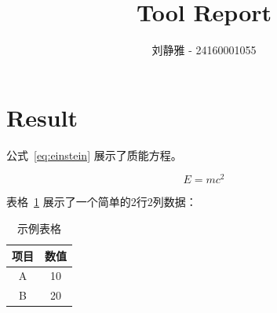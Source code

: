 \documentclass{article}
\begin{document}
\title{Tool Report}
\author{刘静雅 - 24160001055}
\maketitle

\section{Result}

公式~\ref{eq:einstein} 展示了质能方程。

\begin{equation}
E = mc^2
\label{eq:einstein}
\end{equation}

表格~\ref{tab:example} 展示了一个简单的2行2列数据：

\begin{table}[h]
\centering
\caption{示例表格}
\label{tab:example}
\begin{tabular}{|c|c|}
\hline
\textbf{项目} & \textbf{数值} \\
\hline
A & 10 \\
B & 20 \\
\hline
\end{tabular}
\end{table}
\end{document}
